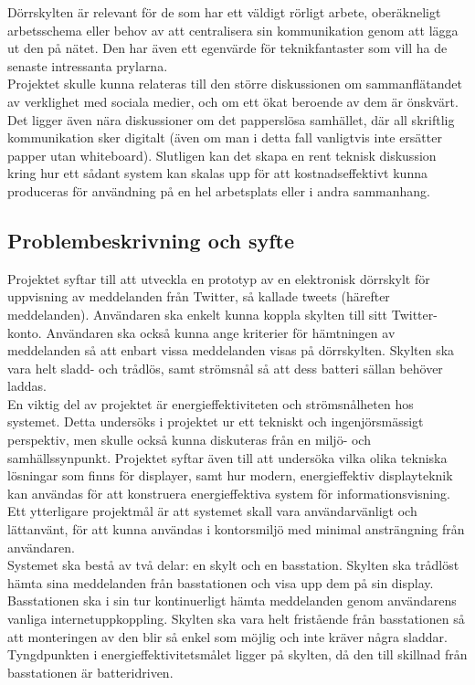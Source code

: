 \documentclass[a4paper,11pt]{article}
\begin{document}
Dörrskylten är relevant för de som har ett väldigt rörligt arbete, oberäkneligt arbetsschema eller behov av att centralisera sin kommunikation genom att lägga ut den på nätet. Den har även ett egenvärde för teknikfantaster som vill ha de senaste intressanta prylarna.\\

Projektet skulle kunna relateras till den större diskussionen om sammanflätandet av verklighet med sociala medier, och om ett ökat beroende av dem är önskvärt. Det ligger även nära diskussioner om det papperslösa samhället, där all skriftlig kommunikation sker digitalt (även om man i detta fall vanligtvis inte ersätter papper utan whiteboard). Slutligen kan det skapa en rent teknisk diskussion kring hur ett sådant system kan skalas upp för att kostnadseffektivt kunna produceras för användning på en hel arbetsplats eller i andra sammanhang.

\subsection{Problembeskrivning och syfte}
Projektet syftar till att utveckla en prototyp av en elektronisk dörrskylt för uppvisning av meddelanden från Twitter, så kallade tweets (härefter meddelanden). Användaren ska enkelt kunna koppla skylten till sitt Twitter-konto. Användaren ska också kunna ange kriterier för hämtningen av meddelanden så att enbart vissa meddelanden visas på dörrskylten. Skylten ska vara helt sladd- och trådlös, samt strömsnål så att dess batteri sällan behöver laddas.\\

En viktig del av projektet är energieffektiviteten och strömsnålheten hos systemet. Detta undersöks i projektet ur ett tekniskt och ingenjörsmässigt perspektiv, men skulle också kunna diskuteras från en miljö- och samhällssynpunkt. Projektet syftar även till att undersöka vilka olika tekniska lösningar som finns för displayer, samt hur modern, energieffektiv displayteknik kan användas för att konstruera energieffektiva system för informationsvisning.\\

Ett ytterligare projektmål är att systemet skall vara användarvänligt och lättanvänt, för att kunna användas i kontorsmiljö med minimal ansträngning från användaren.\\

Systemet ska bestå av två delar: en skylt och en basstation. Skylten ska trådlöst hämta sina meddelanden från basstationen och visa upp dem på sin display. Basstationen ska i sin tur kontinuerligt hämta meddelanden genom användarens vanliga internetuppkoppling. Skylten ska vara helt fristående från basstationen så att monteringen av den blir så enkel som möjlig och inte kräver några sladdar. Tyngdpunkten i energieffektivitetsmålet ligger på skylten, då den till skillnad från basstationen är batteridriven.\\
\end{document}
